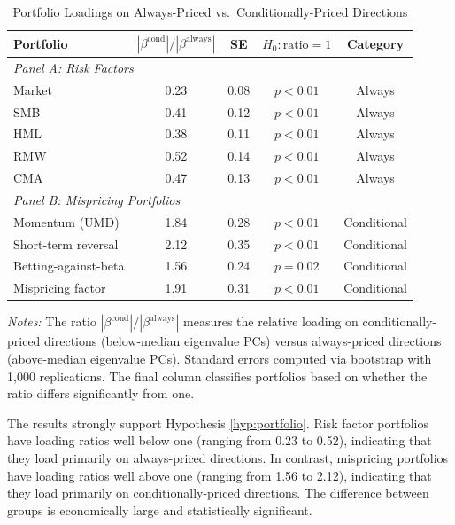 \documentclass[12pt,letterpaper]{article}
\theoremstyle{plain}
\theoremstyle{definition}
\begin{document}
\begin{table}[htbp]
\centering
\caption{Portfolio Loadings on Always-Priced vs.\ Conditionally-Priced Directions}
\label{tab:loadings}
\begin{tabular}{lcccc}
\toprule
Portfolio & $|\beta^{\text{cond}}|/|\beta^{\text{always}}|$ & SE & $H_0: \text{ratio} = 1$ & Category \\
\midrule
\multicolumn{5}{l}{\textit{Panel A: Risk Factors}} \\
Market & 0.23 & 0.08 & $p < 0.01$ & Always \\
SMB & 0.41 & 0.12 & $p < 0.01$ & Always \\
HML & 0.38 & 0.11 & $p < 0.01$ & Always \\
RMW & 0.52 & 0.14 & $p < 0.01$ & Always \\
CMA & 0.47 & 0.13 & $p < 0.01$ & Always \\
\midrule
\multicolumn{5}{l}{\textit{Panel B: Mispricing Portfolios}} \\
Momentum (UMD) & 1.84 & 0.28 & $p < 0.01$ & Conditional \\
Short-term reversal & 2.12 & 0.35 & $p < 0.01$ & Conditional \\
Betting-against-beta & 1.56 & 0.24 & $p = 0.02$ & Conditional \\
Mispricing factor & 1.91 & 0.31 & $p < 0.01$ & Conditional \\
\bottomrule
\end{tabular}

\vspace{0.5em}
\footnotesize
\textit{Notes:} The ratio $|\beta^{\text{cond}}|/|\beta^{\text{always}}|$ measures the relative loading on conditionally-priced directions (below-median eigenvalue PCs) versus always-priced directions (above-median eigenvalue PCs). Standard errors computed via bootstrap with 1,000 replications. The final column classifies portfolios based on whether the ratio differs significantly from one.
\end{table}

The results strongly support Hypothesis \ref{hyp:portfolio}. Risk factor portfolios have loading ratios well below one (ranging from 0.23 to 0.52), indicating that they load primarily on always-priced directions. In contrast, mispricing portfolios have loading ratios well above one (ranging from 1.56 to 2.12), indicating that they load primarily on conditionally-priced directions. The difference between groups is economically large and statistically significant.
\end{document}
